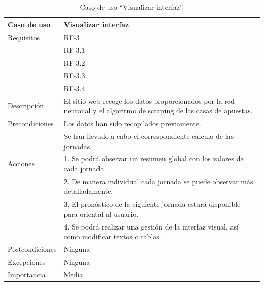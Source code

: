 \begin{table}
  \begin{center}
   \begin{tabular}{|p{3cm} | p{9cm} |}
    \hline
    Caso de uso & Visualizar interfaz\\
    \hline
    Requisitos & RF-3\\
	    & RF-3.1\\
	    & RF-3.2\\
    	& RF-3.3\\
    	& RF-3.4\\
    \hline
    Descripción & El sitio web recoge los datos proporcionados por la red neuronal y el algoritmo de scraping de las casas de apuestas.\\
    \hline
    Precondiciones &Los datos han sido recopilados previamente.\\
    &Se han llevado a cabo el correspondiente cálculo de las jornadas.\\
    \hline
    Acciones & 1. Se podrá observar un resumen global con los valores de cada jornada. \\
    &2. De manera individual cada jornada se puede observar más detalladamente.\\
    &3. El pronóstico de la siguiente jornada estará disponible para oriental al usuario.\\
    &4. Se podrá realizar una gestión de la interfaz visual, así como modificar textos o tablas.\\
    \hline
    Postcondiciones & Ninguna \\
    \hline
    Excepciones & Ninguna\\
    \hline
    Importancia & Media \\
    \hline
   \end{tabular}
   \caption{Caso de uso ``Visualizar interfaz''.}
   \label{tabla:casoUso3}
  \end{center}
 \end{table} 
 
